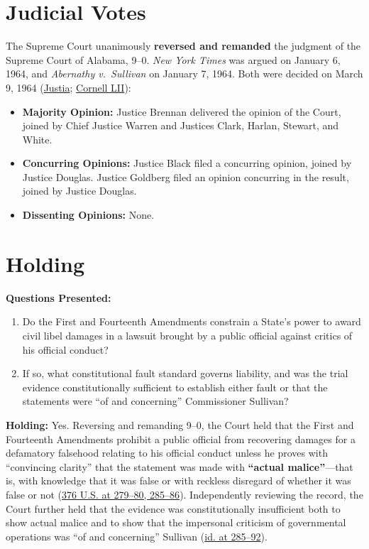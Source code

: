 \documentclass[12pt]{article}
\begin{document}
\section{Judicial Votes}
The Supreme Court unanimously \textbf{reversed and remanded} the judgment of the Supreme Court of Alabama, 9--0. \textit{New York Times} was argued on January 6, 1964, and \textit{Abernathy v.\ Sullivan} on January 7, 1964. Both were decided on March 9, 1964 (\href{https://supreme.justia.com/cases/federal/us/376/254/}{Justia}; \href{https://www.law.cornell.edu/supremecourt/text/376/254}{Cornell LII}):

\begin{itemize}
    \item \textbf{Majority Opinion:} Justice Brennan delivered the opinion of the Court, joined by Chief Justice Warren and Justices Clark, Harlan, Stewart, and White.
    \item \textbf{Concurring Opinions:} Justice Black filed a concurring opinion, joined by Justice Douglas. Justice Goldberg filed an opinion concurring in the result, joined by Justice Douglas.
    \item \textbf{Dissenting Opinions:} None.
\end{itemize}

\section{Holding}
\textbf{Questions Presented:}

\begin{enumerate}
  \item Do the First and Fourteenth Amendments constrain a State's power to award civil libel damages in a lawsuit brought by a public official against critics of his official conduct?
  \item If so, what constitutional fault standard governs liability, and was the trial evidence constitutionally sufficient to establish either fault or that the statements were ``of and concerning'' Commissioner Sullivan?
\end{enumerate}

\textbf{Holding:} Yes. Reversing and remanding 9--0, the Court held that the First and Fourteenth Amendments prohibit a public official from recovering damages for a defamatory falsehood relating to his official conduct unless he proves with ``convincing clarity'' that the statement was made with \textbf{``actual malice''}---that is, with knowledge that it was false or with reckless disregard of whether it was false or not (\href{https://supreme.justia.com/cases/federal/us/376/254/}{376 U.S. at 279--80, 285--86}). Independently reviewing the record, the Court further held that the evidence was constitutionally insufficient both to show actual malice and to show that the impersonal criticism of governmental operations was ``of and concerning'' Sullivan (\href{https://www.law.cornell.edu/supremecourt/text/376/254}{id. at 285--92}).
\end{document}

